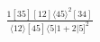 \documentclass[varwidth, border=5pt]{standalone}
\begin{document}
\begin{my}
$\begin{gathered}
\scriptscriptstyle\frac{1[35][12]⟨45⟩^2[34]}{⟨12⟩[45]⟨5|1+2|5]^2}
\end{gathered}$
\end{my}
\end{document}
